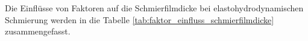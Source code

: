 Die Einflüsse von Faktoren auf die Schmierfilmdicke bei elastohydrodynamischen Schmierung werden in die Tabelle \ref{tab:faktor_einfluss_schmierfilmdicke} zusammengefasst.

